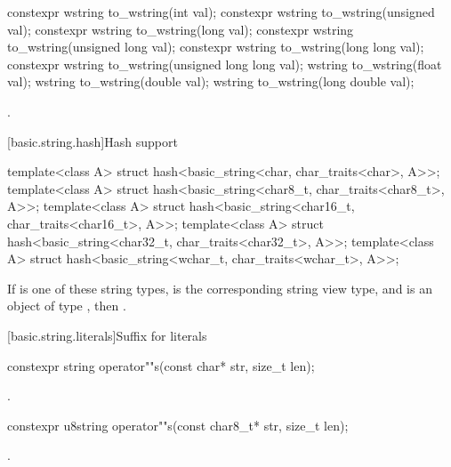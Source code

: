%
\begin{itemdecl}
constexpr wstring to_wstring(int val);
constexpr wstring to_wstring(unsigned val);
constexpr wstring to_wstring(long val);
constexpr wstring to_wstring(unsigned long val);
constexpr wstring to_wstring(long long val);
constexpr wstring to_wstring(unsigned long long val);
wstring to_wstring(float val);
wstring to_wstring(double val);
wstring to_wstring(long double val);
\end{itemdecl}

\begin{itemdescr}
\pnum
\returns
{}.
\end{itemdescr}

[basic.string.hash]{Hash support}

%
%
%
%
%
%
\begin{itemdecl}
template<class A> struct hash<basic_string<char, char_traits<char>, A>>;
template<class A> struct hash<basic_string<char8_t, char_traits<char8_t>, A>>;
template<class A> struct hash<basic_string<char16_t, char_traits<char16_t>, A>>;
template<class A> struct hash<basic_string<char32_t, char_traits<char32_t>, A>>;
template<class A> struct hash<basic_string<wchar_t, char_traits<wchar_t>, A>>;
\end{itemdecl}

\begin{itemdescr}
\pnum
If  is one of these string types,
 is the corresponding string view type, and
 is an object of type ,
then .
\end{itemdescr}

[basic.string.literals]{Suffix for  literals}

%
\begin{itemdecl}
constexpr string operator""s(const char* str, size_t len);
\end{itemdecl}

\begin{itemdescr}
\pnum
\returns
{}.
\end{itemdescr}

%
\begin{itemdecl}
constexpr u8string operator""s(const char8_t* str, size_t len);
\end{itemdecl}
\begin{itemdescr}
\pnum
\returns
{}.
\end{itemdescr}

